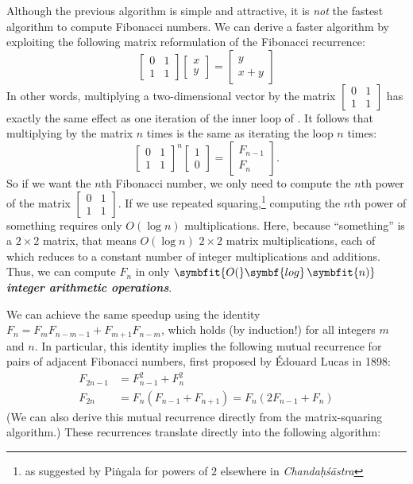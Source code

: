 Although the previous algorithm is simple and attractive, it is \textit{not} the fastest algorithm to compute Fibonacci numbers.
We can derive a faster algorithm by exploiting the following matrix reformulation of the Fibonacci recurrence:
\[
\begin{bmatrix} 0 & 1\\ 1 & 1 \end{bmatrix} \begin{bmatrix} x\\ y \end{bmatrix} = \begin{bmatrix} y\\ x + y \end{bmatrix}
\]
In other words, multiplying a two-dimensional vector by the matrix $\left[\begin{smallmatrix} 0 & 1\\ 1 & 1 \end{smallmatrix}\right]$ has exactly the same effect as one iteration of the inner loop of .
It follows that multiplying by the matrix $n$ times is the same as iterating the loop $n$ times:
\[
\begin{bmatrix} 0 & 1\\ 1 & 1 \end{bmatrix}^n \begin{bmatrix} 1\\ 0 \end{bmatrix} = \begin{bmatrix} F_{n-1}\\ F_n \end{bmatrix}.
\]
So if we want the $n$th Fibonacci number, we only need to compute the $n$th power of the matrix $\left[\begin{smallmatrix} 0 & 1\\ 1 & 1 \end{smallmatrix}\right]$.
If we use repeated squaring,\footnote{as suggested by Pi\.{n}gala for powers of $2$ elsewhere in \textit{Chanda\d{h}\'s\=astra}} computing the $n$th power of something requires only $O(\log n)$ multiplications.
Here, because “something” is a $2 \times 2$ matrix, that means $O(\log n)$ $2 \times 2$ matrix multiplications, each of which reduces to a constant number of integer multiplications and additions.
Thus, we can compute $F_n$ in only \textbf{\textit{$\symbfit{O(}\symbf{log}\,\symbfit{n)}$ integer arithmetic operations}}.

We can achieve the same speedup using the identity $F_n = F_m F_{n-m-1} + F_{m+1} F_{n-m}$, which holds (by induction!) for all integers $m$ and $n$.
In particular, this identity implies the following mutual recurrence for pairs of adjacent Fibonacci numbers, first proposed by Édouard Lucas in 1898:
\begin{align*}
F_{2n-1} &= F_{n-1}^2 + F_n^2\\
F_{2n} &= F_n(F_{n-1} + F_{n+1}) = F_n(2F_{n-1} + F_n)
\end{align*}
(We can also derive this mutual recurrence directly from the matrix-squaring algorithm.)
These recurrences translate directly into the following algorithm:

